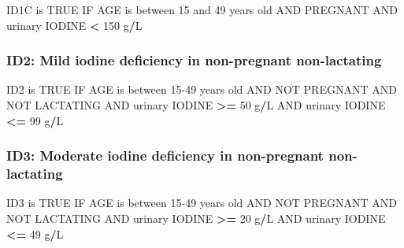 \documentclass[12pt,a4paper]{article}
\newenvironment{Shaded}{\begin{snugshade}}{\end{snugshade}}
\newcommand{\DecValTok}[1]{\textcolor[rgb]{0.00,0.00,0.81}{#1}}
\newcommand{\NormalTok}[1]{#1}
\newcommand{\OperatorTok}[1]{\textcolor[rgb]{0.81,0.36,0.00}{\textbf{#1}}}
\newcommand{\OtherTok}[1]{\textcolor[rgb]{0.56,0.35,0.01}{#1}}
\newcommand{\StringTok}[1]{\textcolor[rgb]{0.31,0.60,0.02}{#1}}
\begin{document}
\begin{Shaded}
\begin{Highlighting}[]
\NormalTok{ID1C is }\OtherTok{TRUE}\NormalTok{ IF AGE is between }\DecValTok{15}\NormalTok{ and }\DecValTok{49}\NormalTok{ years old AND }
\NormalTok{  PREGNANT AND urinary IODINE }\OperatorTok{<}\StringTok{ }\DecValTok{150}\NormalTok{ g}\OperatorTok{/}\NormalTok{L}
\end{Highlighting}
\end{Shaded}

\hypertarget{id2-mild-iodine-deficiency-in-non-pregnant-non-lactating}{%
\subsubsection{ID2: Mild iodine deficiency in non-pregnant non-lactating}\label{id2-mild-iodine-deficiency-in-non-pregnant-non-lactating}}

\begin{Shaded}
\begin{Highlighting}[]
\NormalTok{ID2 is }\OtherTok{TRUE}\NormalTok{ IF AGE is between }\DecValTok{15-49}\NormalTok{ years old AND }
\NormalTok{  NOT PREGNANT AND NOT LACTATING AND }
\NormalTok{  urinary IODINE }\OperatorTok{>=}\StringTok{ }\DecValTok{50}\NormalTok{ g}\OperatorTok{/}\NormalTok{L AND urinary IODINE }\OperatorTok{<=}\StringTok{ }\DecValTok{99}\NormalTok{ g}\OperatorTok{/}\NormalTok{L}
\end{Highlighting}
\end{Shaded}

\hypertarget{id3-moderate-iodine-deficiency-in-non-pregnant-non-lactating}{%
\subsubsection{ID3: Moderate iodine deficiency in non-pregnant non-lactating}\label{id3-moderate-iodine-deficiency-in-non-pregnant-non-lactating}}

\begin{Shaded}
\begin{Highlighting}[]
\NormalTok{ID3 is }\OtherTok{TRUE}\NormalTok{ IF AGE is between }\DecValTok{15-49}\NormalTok{ years old AND }
\NormalTok{  NOT PREGNANT AND NOT LACTATING AND }
\NormalTok{  urinary IODINE }\OperatorTok{>=}\StringTok{ }\DecValTok{20}\NormalTok{ g}\OperatorTok{/}\NormalTok{L AND urinary IODINE }\OperatorTok{<=}\StringTok{ }\DecValTok{49}\NormalTok{ g}\OperatorTok{/}\NormalTok{L}
\end{Highlighting}
\end{Shaded}
\end{document}
